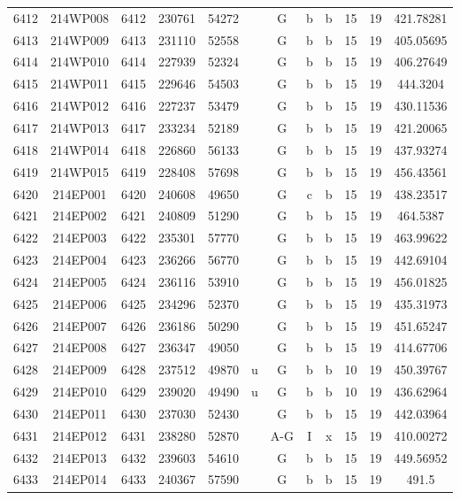 \begin{tabular}{|*{12}{c|}}
6412 & 214WP008 & 6412 & 230761 & 54272 &  & G & b & b & 15 & 19 & 421.78281 \\ 
6413 & 214WP009 & 6413 & 231110 & 52558 &  & G & b & b & 15 & 19 & 405.05695 \\ 
6414 & 214WP010 & 6414 & 227939 & 52324 &  & G & b & b & 15 & 19 & 406.27649 \\ 
6415 & 214WP011 & 6415 & 229646 & 54503 &  & G & b & b & 15 & 19 & 444.3204 \\ 
6416 & 214WP012 & 6416 & 227237 & 53479 &  & G & b & b & 15 & 19 & 430.11536 \\ 
6417 & 214WP013 & 6417 & 233234 & 52189 &  & G & b & b & 15 & 19 & 421.20065 \\ 
6418 & 214WP014 & 6418 & 226860 & 56133 &  & G & b & b & 15 & 19 & 437.93274 \\ 
6419 & 214WP015 & 6419 & 228408 & 57698 &  & G & b & b & 15 & 19 & 456.43561 \\ 
6420 & 214EP001 & 6420 & 240608 & 49650 &  & G & c & b & 15 & 19 & 438.23517 \\ 
6421 & 214EP002 & 6421 & 240809 & 51290 &  & G & b & b & 15 & 19 & 464.5387 \\ 
6422 & 214EP003 & 6422 & 235301 & 57770 &  & G & b & b & 15 & 19 & 463.99622 \\ 
6423 & 214EP004 & 6423 & 236266 & 56770 &  & G & b & b & 15 & 19 & 442.69104 \\ 
6424 & 214EP005 & 6424 & 236116 & 53910 &  & G & b & b & 15 & 19 & 456.01825 \\ 
6425 & 214EP006 & 6425 & 234296 & 52370 &  & G & b & b & 15 & 19 & 435.31973 \\ 
6426 & 214EP007 & 6426 & 236186 & 50290 &  & G & b & b & 15 & 19 & 451.65247 \\ 
6427 & 214EP008 & 6427 & 236347 & 49050 &  & G & b & b & 15 & 19 & 414.67706 \\ 
6428 & 214EP009 & 6428 & 237512 & 49870 & u & G & b & b & 10 & 19 & 450.39767 \\ 
6429 & 214EP010 & 6429 & 239020 & 49490 & u & G & b & b & 10 & 19 & 436.62964 \\ 
6430 & 214EP011 & 6430 & 237030 & 52430 &  & G & b & b & 15 & 19 & 442.03964 \\ 
6431 & 214EP012 & 6431 & 238280 & 52870 &  & A-G & I & x & 15 & 19 & 410.00272 \\ 
6432 & 214EP013 & 6432 & 239603 & 54610 &  & G & b & b & 15 & 19 & 449.56952 \\ 
6433 & 214EP014 & 6433 & 240367 & 57590 &  & G & b & b & 15 & 19 & 491.5 \\ 

\end{tabular}
